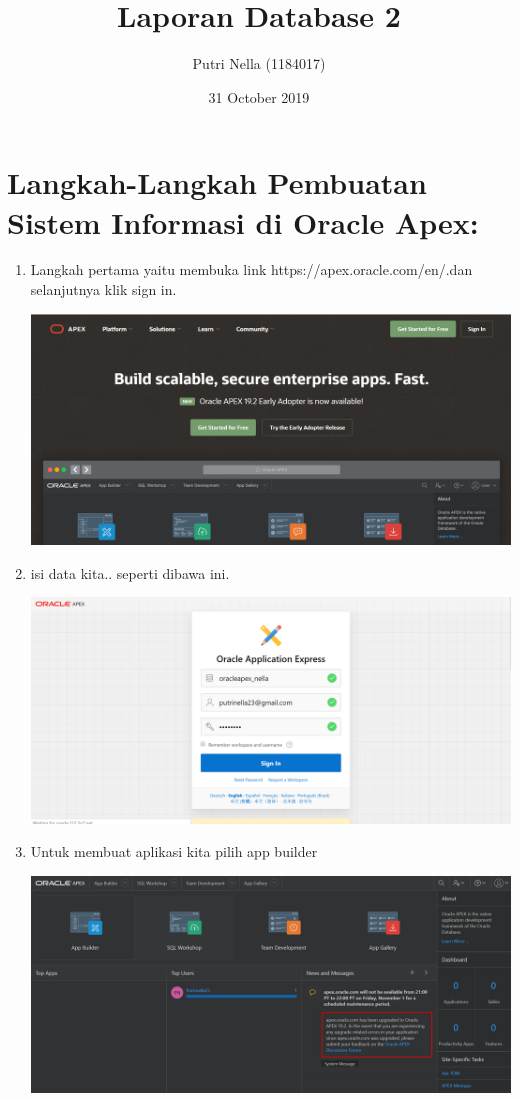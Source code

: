 \documentclass{article}
\title{Laporan Database 2}
\author{Putri Nella (1184017)}
\date{31 October 2019}
\begin{document}
\maketitle

\section{Langkah-Langkah Pembuatan Sistem Informasi di Oracle Apex:}
\begin{enumerate}
    \item Langkah pertama yaitu membuka link https://apex.oracle.com/en/.dan selanjutnya klik sign in.
  \begin{center}
    \includegraphics[width=.8\textwidth]{figure/1.PNG}
\end{center}
    \item isi data kita.. seperti dibawa ini.
    \begin{center}
    \includegraphics[width=.8\textwidth]{figure/2.PNG}
\end{center}
    \item Untuk membuat aplikasi kita pilih app builder
    \begin{center}
    \includegraphics[width=.8\textwidth]{figure/3.PNG}

\end{center}
\end{enumerate}
\end{document}
